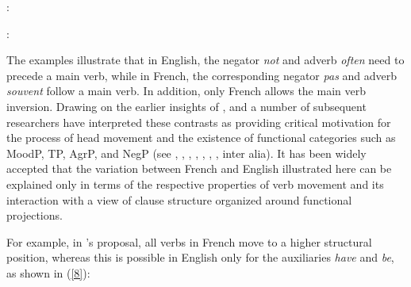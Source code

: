 \documentclass[output=paper]{langsci/langscibook}
\begin{document}
:

\begin{exe}
\ex \begin{xlist}
\end{xlist} \end{exe}

\begin{exe}
\ex \begin{xlist}
\end{xlist} \end{exe}

:

\begin{exe}
\ex \begin{xlist}
\end{xlist} \end{exe}


\begin{exe}
\ex \begin{xlist}
\end{xlist} \end{exe}




The examples illustrate that in English, the negator {\it not}
and adverb {\it often} need to precede a main verb, while in French,
the corresponding negator {\it pas} and adverb {\it souvent} follow
a main verb. In addition, only French allows the main verb inversion.
Drawing on the earlier insights of \citet{Emonds:78},
\citet{Pollock:89,Pollock:94} and a number of subsequent researchers
have interpreted these contrasts as providing critical motivation for
the process of head movement and the existence of functional
categories such as MoodP, TP, AgrP, and NegP (see \citet{Belletti:90}, \citet{Zanuttini:91,Zanuttini:97,Zanuttini:01}, \citet{Chomsky:91,Chomsky:93,Chomsky:95}, \citet{Lasnik:95}, \citet{Haegeman:95,Haegeman:97}, \citet{Vikner:97}, \citet{Zeijlstra:15}, inter alia).
It has been widely
accepted that the variation between French and English illustrated
here can be explained only in terms of the respective properties
of verb movement and its interaction with a view of clause
structure organized around functional projections.

For example, in \citet{Pollock:89}'s proposal, all verbs in French
move to a higher structural position, whereas this is possible in
English only for the auxiliaries \emph{have} and \emph{be}, as
shown in (\ref{8}):
\end{document}
